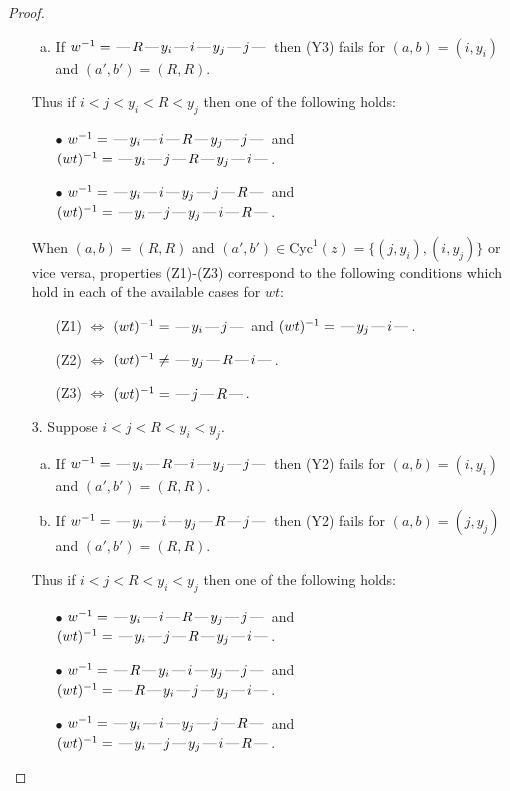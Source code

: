 \documentclass[10pt]{article}
\theoremstyle{definition}
\theoremstyle{definition}
\def\dash{\text{\hspace{0.5mm}---\hspace{0.5mm}}}
\def\Cyc{\mathrm{Cyc}}
\begin{document}
\begin{proof}
\begin{enumerate}
\begin{enumerate}[(a)]
\item If $w^{-1} = \dash R\dash y_i\dash i\dash y_j\dash j\dash $ then (Y3) fails for $(a,b)=(i,y_i)$ and $(a',b')=(R,R)$.
\end{enumerate}
Thus if $i < j < y_i < R < y_j$ then one of the following holds:
\begin{enumerate}
\item[$\bullet$] $w^{-1} = \dash y_i\dash i\dash R\dash y_j\dash j\dash $ and $(wt)^{-1} = \dash y_i\dash j\dash R\dash y_j\dash i\dash $.
\item[$\bullet$] $w^{-1} = \dash y_i\dash i\dash y_j\dash j\dash R\dash $ and $(wt)^{-1} = \dash y_i\dash j\dash y_j\dash i\dash R\dash $.
\end{enumerate}
When $(a,b)= (R,R)$ and $(a',b')\in \Cyc^1(z)=\{(j,y_i),(i,y_j)\}$ or vice versa,
properties (Z1)-(Z3) correspond to the following conditions which
hold in each of the available cases for $wt$:
\begin{enumerate}
\item[](Z1) $\Leftrightarrow$ $(wt)^{-1} = \dash y_i \dash j \dash$  and $(wt)^{-1} = \dash y_j \dash i \dash$.
\item[](Z2) $\Leftrightarrow$ $(wt)^{-1} \neq \dash y_j \dash R \dash i \dash$.
\item[](Z3) $\Leftrightarrow$ $(wt)^{-1} = \dash j \dash R \dash$.
\end{enumerate}
\item[$3$.] Suppose $i < j < R < y_i < y_j$.
\begin{enumerate}[(a)]
\item If $w^{-1} = \dash y_i\dash R\dash i\dash y_j\dash j\dash $ then (Y2) fails for $(a,b)=(i,y_i)$ and $(a',b')=(R,R)$.
\item If $w^{-1} = \dash y_i\dash i\dash y_j\dash R\dash j\dash $ then (Y2) fails for $(a,b)=(j,y_j)$ and $(a',b')=(R,R)$.
\end{enumerate}
Thus if $i < j < R < y_i < y_j$ then one of the following holds:
\begin{enumerate}
\item[$\bullet$] $w^{-1} = \dash y_i\dash i\dash R\dash y_j\dash j\dash $ and $(wt)^{-1} = \dash y_i\dash j\dash R\dash y_j\dash i\dash $.
\item[$\bullet$] $w^{-1} = \dash R\dash y_i\dash i\dash y_j\dash j\dash $ and $(wt)^{-1} = \dash R\dash y_i\dash j\dash y_j\dash i\dash $.
\item[$\bullet$] $w^{-1} = \dash y_i\dash i\dash y_j\dash j\dash R\dash $ and $(wt)^{-1} = \dash y_i\dash j\dash y_j\dash i\dash R\dash $.

\end{enumerate}
\end{enumerate}
\end{proof}
\end{document}
